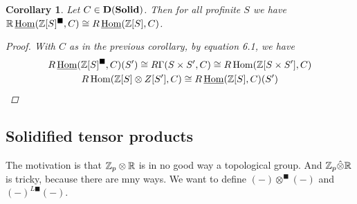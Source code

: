 \documentclass[A4paper, british, reqno]{amsart}
\theoremstyle{darkgreentheorem}
\newtheorem{cor}[thm]{Corollary}
\theoremstyle{darkbluedefinition}
\theoremstyle{darkredexample}
\theoremstyle{remark}
\DeclareMathOperator{\Hom}{Hom}
\DeclareMathOperator{\ihom}{\underline{Hom}}
\newcommand{\Solid}{\mathbf{Solid}}
\newcommand{\1}{\mathbbm{1}}
\newcommand{\ot}{\otimes}
\newcommand{\tms}{\times}
\newcommand{\solid}{^{\blacksquare}}
\newcommand{\dsolid}{^{L\blacksquare}}
\begin{document}
\begin{cor}
    Let $C\in \D(\Solid)$.
    Then for all profinite $S$ we have $\R\ihom(\Z[S]\solid,C)\cong R\ihom(\Z[S],C)$.
    \begin{proof}
	With $C$ as in the previous corollary, by equation 6.1, we have
	\begin{multline*}
	    R\ihom(\Z[S]\solid,C)(S')\cong R\Gamma(S\tms S',C)\cong R\Hom(\Z[S\tms S'],C) \\
	    R\Hom(\Z[S]\ot Z[S'],C)\cong R\ihom(\Z[S],C)(S')
	\end{multline*}
    \end{proof}
\end{cor}

\subsection{Solidified tensor products}

The motivation is that $\Z_{p}\ot \R$ is in no good way a topological group.
And $\Z_{p}\hat{\ot}\R$ is tricky, because there are mny ways.
We want to define $(-)\ot\solid (-)$ and $(-)\dsolid(-)$.
\end{document}
